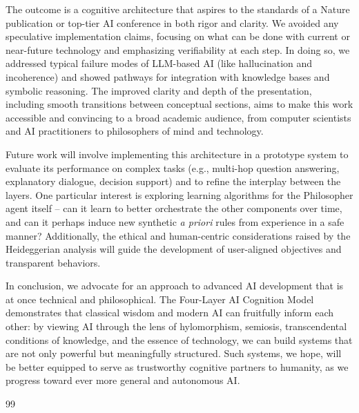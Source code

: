 \documentclass{article}
\begin{document}
The outcome is a cognitive architecture that aspires to the standards of a Nature publication or top-tier AI conference in both rigor and clarity. We avoided any speculative implementation claims, focusing on what can be done with current or near-future technology and emphasizing verifiability at each step. In doing so, we addressed typical failure modes of LLM-based AI (like hallucination and incoherence) and showed pathways for integration with knowledge bases and symbolic reasoning. The improved clarity and depth of the presentation, including smooth transitions between conceptual sections, aims to make this work accessible and convincing to a broad academic audience, from computer scientists and AI practitioners to philosophers of mind and technology.

Future work will involve implementing this architecture in a prototype system to evaluate its performance on complex tasks (e.g., multi-hop question answering, explanatory dialogue, decision support) and to refine the interplay between the layers. One particular interest is exploring learning algorithms for the Philosopher agent itself – can it learn to better orchestrate the other components over time, and can it perhaps induce new synthetic \emph{a priori} rules from experience in a safe manner? Additionally, the ethical and human-centric considerations raised by the Heideggerian analysis will guide the development of user-aligned objectives and transparent behaviors.

In conclusion, we advocate for an approach to advanced AI development that is at once technical and philosophical. The Four-Layer AI Cognition Model demonstrates that classical wisdom and modern AI can fruitfully inform each other: by viewing AI through the lens of hylomorphism, semiosis, transcendental conditions of knowledge, and the essence of technology, we can build systems that are not only powerful but meaningfully structured. Such systems, we hope, will be better equipped to serve as trustworthy cognitive partners to humanity, as we progress toward ever more general and autonomous AI. 

{99}\setlength{\itemsep}{0ex}\small
\end{document}
